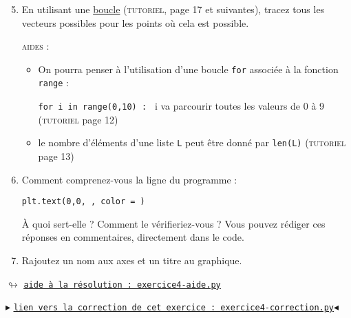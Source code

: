 \documentclass[11pt]{article}
\begin{document}
 \begin{enumerate}
 
 \setcounter{enumi}{4}
 \item En utilisant une \underline{boucle} (\textsc{tutoriel}, page 17 et suivantes), tracez tous les vecteurs possibles pour les points où cela est possible.
 
 
 \smallskip
 \textsc{aides : }
 \begin{itemize}
 \item On pourra penser à l'utilisation d'une boucle \texttt{for} associée à la fonction \texttt{range} : 
 
 \texttt{for i in range(0,10) : } i va parcourir toutes les valeurs de 0 à 9 (\textsc{tutoriel} page 12)
  \item le nombre d'éléments d'une liste \texttt{L} peut être donné par \texttt{len(L)} (\textsc{tutoriel} page 13)
 \end{itemize}

 
 \item Comment comprenez-vous la ligne du programme : 
 
 \texttt{plt.text(0,0, , color = )}
 
 
 À quoi sert-elle ? Comment le vérifieriez-vous ? Vous pouvez rédiger ces réponses en commentaires, directement dans le code.
 
 
 
 \item Rajoutez un nom aux axes et un titre au graphique.

 
 \end{enumerate}



 
 


\begin{center}
 $\looparrowright$ \href{https://github.com/formationPythonPC-Juin/aides-formation/blob/master/exercice4-aide.py}{\underline{\texttt{aide à la résolution : exercice4-aide.py}}}
\end{center}



\begin{center}
$\blacktriangleright$ \href{https://github.com/formationPythonPC-Juin/corrections-formation/blob/master/exercice4-correction.py}{\underline{\texttt{lien vers la correction de cet exercice : exercice4-correction.py}}}$\blacktriangleleft$                                                                                                                                                                    \end{center}
\end{document}
